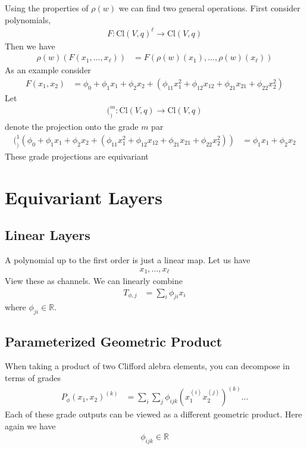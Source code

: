 \documentclass[book.tex]{subfiles}
\begin{document}
Using the properties of $\rho(w)$ we can find two general operations. First consider polynomials,
\begin{align}
F: \mathrm{Cl}(V, q)^\ell \to \mathrm{Cl}(V, q)
\end{align}
Then we have
\begin{align}
    \rho(w)(F(x_1, \dotsc, x_\ell)) &= F(\rho(w)(x_1),\dotsc, \rho(w)(x_\ell))
\end{align}
As an example consider
\begin{align}
    F(x_1, x_2) &= \phi_0 + \phi_1 x_1 + \phi_2 x_2 + (\phi_{11}x_1^2 + \phi_{12} x_{12} + \phi_{21} x_{21} + \phi_{22} x_2^2)
\end{align}
Let 
\begin{align}
    (_)^m: \mathrm{Cl}(V, q) \to \mathrm{Cl}(V, q)
\end{align}
denote the projection onto the grade $m$ par
\begin{align}
    (_)^1(\phi_0 + \phi_1 x_1 + \phi_2 x_2 + (\phi_{11}x_1^2 + \phi_{12} x_{12} + \phi_{21} x_{21} + \phi_{22} x_2^2)) &= \phi_1 x_1 + \phi_2 x_2
\end{align}
These grade projections are equivariant

\section{Equivariant Layers}
\subsection{Linear Layers}
A polynomial up to the first order is just a linear map. Let us have
\begin{align}
    x_1, \dotsc, x_\ell
\end{align}
View these as channels. We can linearly combine
\begin{align}
    T_{\phi, j} &= \sum_{i} \phi_{ji}x_i
\end{align}
where $\phi_{ji} \in \mathbb{R}$. 
\subsection{Parameterized Geometric Product}
When taking a product of two Clifford alebra elements, you can decompose in terms of grades
\begin{align}
P_\phi(x_1, x_2)^{(k)} &= \sum_{i} \sum_j \phi_{ijk} (x_1^{(i)} x_2^{(j)})^{(k)} \dotsc
\end{align}
Each of these grade outputs can be viewed as a different geometric product. Here again we have
\begin{align}
    \phi_{ijk} \in \mathbb{R}
\end{align}
\end{document}
